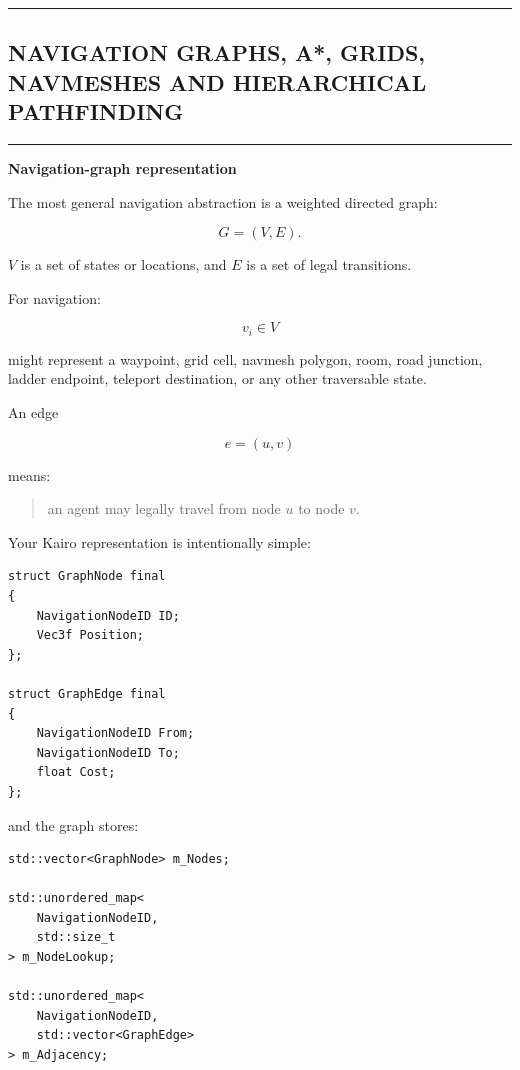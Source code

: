 \begin{center}\rule{0.5\linewidth}{0.5pt}\end{center}

\subsection{NAVIGATION GRAPHS, A*, GRIDS, NAVMESHES AND HIERARCHICAL PATHFINDING}\label{06-engine-ii-ch030-navigation-graphs-a-grids-navmeshes-and-hierarchical-pathfinding}

\begin{center}\rule{0.5\linewidth}{0.5pt}\end{center}

\textbf{Navigation-graph representation}

The most general navigation abstraction is a weighted directed graph:

\[
G=(V,E).
\]

\(V\) is a set of states or locations, and \(E\) is a set of legal transitions.

For navigation:

\[
v_i\in V
\]

might represent a waypoint, grid cell, navmesh polygon, room, road junction, ladder endpoint, teleport destination, or any other traversable state.

An edge

\[
e=(u,v)
\]

means:

\begin{quote}
an agent may legally travel from node \(u\) to node \(v\).
\end{quote}

Your Kairo representation is intentionally simple:

\begin{verbatim}
struct GraphNode final
{
    NavigationNodeID ID;
    Vec3f Position;
};

struct GraphEdge final
{
    NavigationNodeID From;
    NavigationNodeID To;
    float Cost;
};
\end{verbatim}

and the graph stores:

\begin{verbatim}
std::vector<GraphNode> m_Nodes;

std::unordered_map<
    NavigationNodeID,
    std::size_t
> m_NodeLookup;

std::unordered_map<
    NavigationNodeID,
    std::vector<GraphEdge>
> m_Adjacency;
\end{verbatim}

